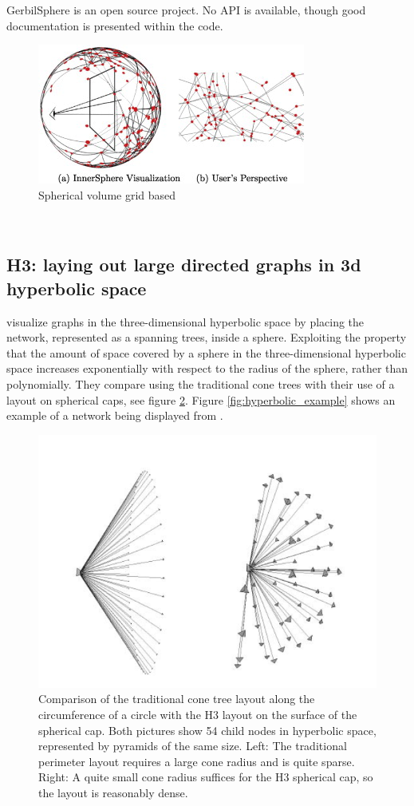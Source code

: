 \documentclass[a4paper,11pt]{kth-mag}
\begin{document}
GerbilSphere is an open source project. No API is available, though good documentation is presented within the code.
 \begin{figure}[!htbp]
	\centering
	\includegraphics{GerbilPointOfView}
	\caption{Spherical volume grid based}
	\label{fig:gerbil_POV}
\end{figure}
\\
\subsection{H3: laying out large directed graphs in 3d hyperbolic space}
\cite{636718} visualize graphs in the three-dimensional hyperbolic space by placing the network, represented as a spanning trees, inside a sphere. Exploiting the property that the amount of space covered by a sphere
 in the three-dimensional hyperbolic space increases exponentially with respect to the radius of the sphere, rather than polynomially. They compare using the traditional cone trees with their use of a layout on spherical caps, 
 see figure \ref{fig:hyperbolic_cone_tree}.
 Figure \ref{fig:hyperbolic_example} shows an example of a network being displayed from \cite{636718}.
 
  \begin{figure}[!htbp]
	\centering
	\includegraphics[scale=0.5]{H3ConeVSHem}
	\caption{Comparison of the traditional cone tree layout along the circumference
of a circle with the H3 layout on the surface of the spherical
cap. Both pictures show 54 child nodes in hyperbolic space, represented
by pyramids of the same size. Left: The traditional perimeter
layout requires a large cone radius and is quite sparse. Right: A
quite small cone radius suffices for the H3 spherical cap, so the layout
is reasonably dense.}
	\label{fig:hyperbolic_cone_tree}
\end{figure}
 
\end{document}
